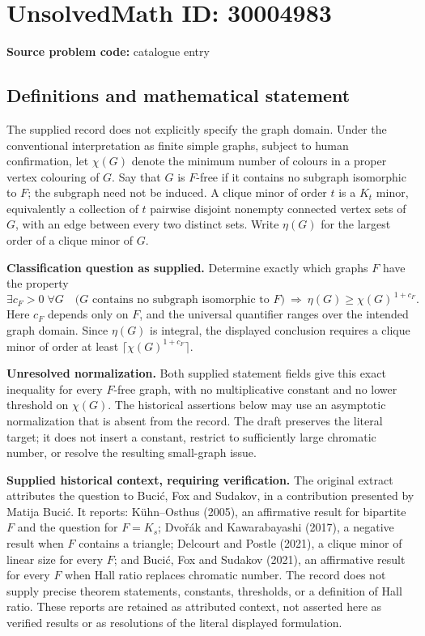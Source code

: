 \documentclass[11pt]{article}
\begin{document}
\section*{UnsolvedMath ID: 30004983}
\textbf{Source problem code:} catalogue entry
\subsection{Definitions and mathematical statement}
The supplied record does not explicitly specify the graph domain. Under the conventional interpretation as finite simple graphs, subject to human confirmation, let \(\chi(G)\) denote the minimum number of colours in a proper vertex colouring of \(G\). Say that \(G\) is \(F\)-free if it contains no subgraph isomorphic to \(F\); the subgraph need not be induced. A clique minor of order \(t\) is a \(K_t\) minor, equivalently a collection of \(t\) pairwise disjoint nonempty connected vertex sets of \(G\), with an edge between every two distinct sets. Write \(\eta(G)\) for the largest order of a clique minor of \(G\).

\textbf{Classification question as supplied.} Determine exactly which graphs \(F\) have the property
\[
\exists c_F>0\;\forall G\quad
\bigl(G\text{ contains no subgraph isomorphic to }F\bigr)
\ \Longrightarrow\ 
\eta(G)\geq \chi(G)^{\,1+c_F}.
\]
Here \(c_F\) depends only on \(F\), and the universal quantifier ranges over the intended graph domain. Since \(\eta(G)\) is integral, the displayed conclusion requires a clique minor of order at least \(\lceil\chi(G)^{1+c_F}\rceil\).

\textbf{Unresolved normalization.} Both supplied statement fields give this exact inequality for every \(F\)-free graph, with no multiplicative constant and no lower threshold on \(\chi(G)\). The historical assertions below may use an asymptotic normalization that is absent from the record. The draft preserves the literal target; it does not insert a constant, restrict to sufficiently large chromatic number, or resolve the resulting small-graph issue.

\textbf{Supplied historical context, requiring verification.} The original extract attributes the question to Bucić, Fox and Sudakov, in a contribution presented by Matija Bucić. It reports: Kühn--Osthus (2005), an affirmative result for bipartite \(F\) and the question for \(F=K_s\); Dvořák and Kawarabayashi (2017), a negative result when \(F\) contains a triangle; Delcourt and Postle (2021), a clique minor of linear size for every \(F\); and Bucić, Fox and Sudakov (2021), an affirmative result for every \(F\) when Hall ratio replaces chromatic number. The record does not supply precise theorem statements, constants, thresholds, or a definition of Hall ratio. These reports are retained as attributed context, not asserted here as verified results or as resolutions of the literal displayed formulation.
\end{document}

